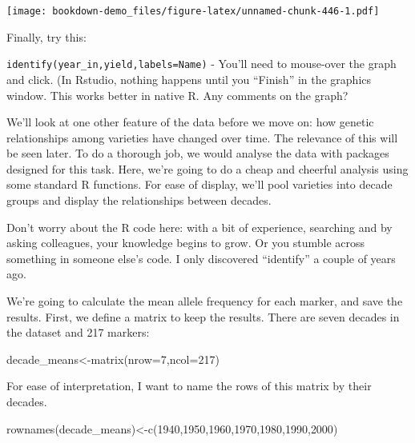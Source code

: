 \documentclass[
]{book}
\newenvironment{Shaded}{\begin{snugshade}}{\end{snugshade}}
\newcommand{\AttributeTok}[1]{\textcolor[rgb]{0.77,0.63,0.00}{#1}}
\newcommand{\DecValTok}[1]{\textcolor[rgb]{0.00,0.00,0.81}{#1}}
\newcommand{\FunctionTok}[1]{\textcolor[rgb]{0.00,0.00,0.00}{#1}}
\newcommand{\NormalTok}[1]{#1}
\newcommand{\OtherTok}[1]{\textcolor[rgb]{0.56,0.35,0.01}{#1}}
\begin{document}
\texttt{[image: bookdown-demo\_files/figure-latex/unnamed-chunk-446-1.pdf]}

Finally, try this:

\texttt{identify(year\_in,yield,labels=Name)} - You'll need to mouse-over the graph and click. (In Rstudio, nothing happens until you ``Finish'' in the graphics window. This works better in native R. Any comments on the graph?

We'll look at one other feature of the data before we move on: how genetic relationships
among varieties have changed over time. The relevance of this will be seen later. To do a thorough job, we would analyse the data with packages designed for this task. Here, we're going to do a cheap and cheerful analysis using some standard R functions. For ease of
display, we'll pool varieties into decade groups and display the relationships between
decades.

Don't worry about the R code here: with a bit of experience, searching and by asking
colleagues, your knowledge begins to grow. Or you stumble across something in someone else's code. I only discovered ``identify'' a couple of years ago.

We're going to calculate the mean allele frequency for each marker, and save the results.
First, we define a matrix to keep the results. There are seven decades in the dataset and 217
markers:

\begin{Shaded}
\begin{Highlighting}[]
\NormalTok{decade\_means}\OtherTok{\textless{}{-}}\FunctionTok{matrix}\NormalTok{(}\AttributeTok{nrow=}\DecValTok{7}\NormalTok{,}\AttributeTok{ncol=}\DecValTok{217}\NormalTok{)}
\end{Highlighting}
\end{Shaded}

For ease of interpretation, I want to name the rows of this matrix by their decades.

\begin{Shaded}
\begin{Highlighting}[]
\FunctionTok{rownames}\NormalTok{(decade\_means)}\OtherTok{\textless{}{-}}\FunctionTok{c}\NormalTok{(}\DecValTok{1940}\NormalTok{,}\DecValTok{1950}\NormalTok{,}\DecValTok{1960}\NormalTok{,}\DecValTok{1970}\NormalTok{,}\DecValTok{1980}\NormalTok{,}\DecValTok{1990}\NormalTok{,}\DecValTok{2000}\NormalTok{)}
\end{Highlighting}
\end{Shaded}
\end{document}
